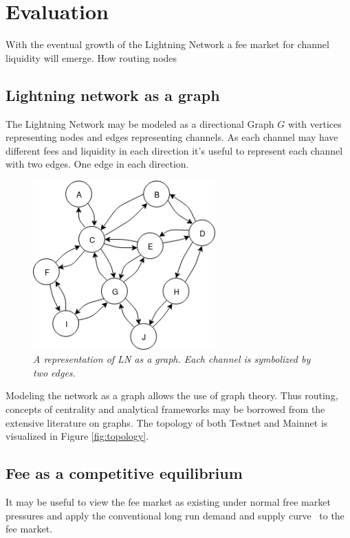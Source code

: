 \chapter{Evaluation}

With the eventual growth of the Lightning Network a fee market for channel liquidity will emerge. How routing nodes 

\section{Lightning network as a graph}

The Lightning Network may be modeled as a directional Graph $G$ with vertices representing nodes and edges representing channels. As each channel may have different fees and liquidity in each direction it's useful to represent each channel with two edges. One edge in each direction. 

\begin{figure}[!htb]
	\hspace*{-0.7cm} 
	\centering
	\includegraphics[width=7cm]{images/LN_overview.png}
	\caption{ \textit{A representation of LN as a graph. Each channel is symbolized by two edges.} 
	}
	\label{fig:ln:graph}
	\hspace*{2mm}
\end{figure}

Modeling the network as a graph allows the use of graph theory. Thus routing, concepts of centrality and analytical frameworks may be borrowed from the extensive literature on graphs. The topology of both Testnet and Mainnet is visualized in Figure \ref{fig:topology}.

\section{Fee as a competitive equilibrium}

It may be useful to view the fee market as existing under normal free market pressures and apply the conventional long run demand and supply curve~\cite{boulding:evolutionary:economy} to the fee market. 

